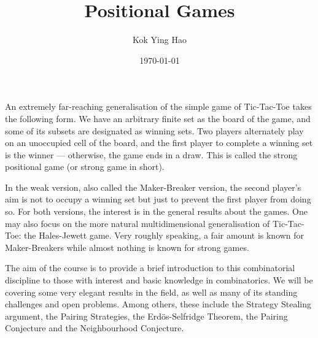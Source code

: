 \documentclass[12pt]{article}
\title{Positional Games}
\author{Kok Ying Hao}
\date{\today}
\begin{document}
\maketitle

\noindent An extremely far-reaching generalisation of the simple game of Tic-Tac-Toe takes the following
form. We have an arbitrary finite set as the board of the game, and some of its subsets are
designated as winning sets. Two players alternately play on an unoccupied cell of the board,
and the first player to complete a winning set is the winner — otherwise, the game ends in a
draw. This is called the strong positional game (or strong game in short).

In the weak version, also called the Maker-Breaker version, the second player’s aim is not to
occupy a winning set but just to prevent the first player from doing so. For both versions,
the interest is in the general results about the games. One may also focus on the more natural
multidimensional generalisation of Tic-Tac-Toe: the Hales-Jewett game. Very roughly speaking,
a fair amount is known for Maker-Breakers while almost nothing is known for strong games.

The aim of the course is to provide a brief introduction to this combinatorial discipline to those
with interest and basic knowledge in combinatorics. We will be covering some very elegant
results in the field, as well as many of its standing challenges and open problems. Among
others, these include the Strategy Stealing argument, the Pairing Strategies, the Erd\"{o}s-Selfridge
Theorem, the Pairing Conjecture and the Neighbourhood Conjecture.

\tableofcontents




\newpage

\end{document}
